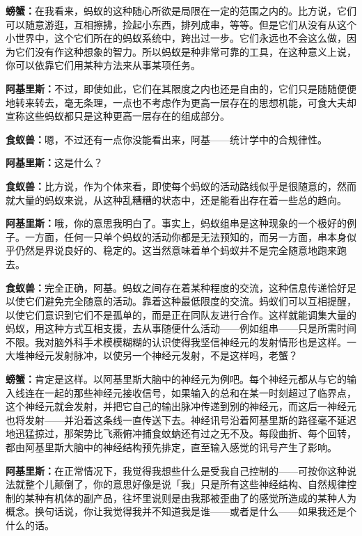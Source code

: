 \documentclass[
  12pt,
  twoside,
  openright,
  oldfontcommands,
]{memoir}
\newcommand{\dialogname}[1]{{\heifamily\bfseries #1}}
\begin{document}
\dialogname{螃蟹：}在我看来，蚂蚁的这种随心所欲是局限在一定的范围之内的。比方说，它们可以随意游逛，互相擦拂，捡起小东西，排列成串，等等。但是它们从没有从这个小世界中，这个它们所在的蚂蚁系统中，跨出过一步。它们永远也不会这么做，因为它们没有作这种想象的智力。所以蚂蚁是种非常可靠的工具，在这种意义上说，你可以依靠它们用某种方法来从事某项任务。

\dialogname{阿基里斯：}不过，即使如此，它们在其限度之内也还是自由的，它们只是随随便便地转来转去，毫无条理，一点也不考虑作为更高一层存在的思想机能，可食大夫却宣称这些蚂蚁都只是这种更高一层存在的组成部分。

\dialogname{食蚁兽：}嗯，不过还有一点你没能看出来，阿基------统计学中的合规律性。

\dialogname{阿基里斯：}这是什么？

\dialogname{食蚁兽：}比方说，作为个体来看，即使每个蚂蚁的活动路线似乎是很随意的，然而就大量的蚂蚁来说，从这种乱糟糟的状态中，还是能看出存在着一些总的趋向。

\dialogname{阿基里斯：}哦，你的意思我明白了。事实上，蚂蚁组串是这种现象的一个极好的例子。一方面，任何一只单个蚂蚁的活动你都是无法预知的，而另一方面，串本身似乎仍然是界说良好的、稳定的。这当然意味着单个蚂蚁并不是完全随意地跑来跑去。

\dialogname{食蚁兽：}完全正确，阿基。蚂蚁之间存在着某种程度的交流，这种信息传递恰好足以使它们避免完全随意的活动。靠着这种最低限度的交流。蚂蚁们可以互相提醒，以使它们意识到它们不是孤单的，而是正在同队友进行合作。这样就能调集大量的蚂蚁，用这种方式互相支援，去从事随便什么活动------例如组串------只是所需时间不限。我对脑外科手术模模糊糊的认识使得我坚信神经元的发射情形也是这样。一大堆神经元发射脉冲，以使另一个神经元发射，不是这样吗，老蟹？

\dialogname{螃蟹：}肯定是这样。以阿基里斯大脑中的神经元为例吧。每个神经元都从与它的输入线连在一起的那些神经元接收信号，如果输入的总和在某一时刻超过了临界点，这个神经元就会发射，并把它自己的输出脉冲传递到别的神经元，而这后一神经元也将发射------并沿着这条线一直传送下去。神经讯号沿着阿基里斯的路径毫不延迟地迅猛掠过，那架势比飞燕俯冲捕食蚊蚋还有过之无不及。每段曲折、每个回转，都由阿基里斯大脑中的神经结构预先排定，直至输入感觉的讯号产生了影响。

\dialogname{阿基里斯：}在正常情况下，我觉得我想些什么是受我自己控制的------可按你这种说法就整个儿颠倒了，你的意思好像是说「我」只是所有这些神经结构、自然规律控制的某种有机体的副产品，往坏里说则是由我那被歪曲了的感觉所造成的某种人为概念。换句话说，你让我觉得我并不知道我是谁------或者是什么------如果我还是个什么的话。
\end{document}
